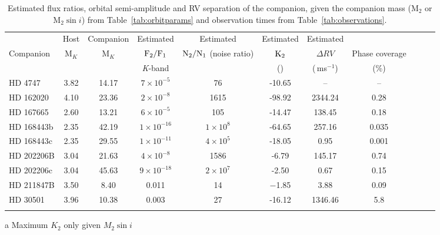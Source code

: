 \begin{table*}
        \small
        \centering
       \begin{threeparttable}[b]
        \caption{Estimated flux ratios, orbital semi-amplitude and RV separation of the companion, given the companion mass (\(\textrm{M}_{2}\) or \(\textrm{M}_{2} \sin{i}\)) from Table~\ref{tab:orbitparams} and observation times from Table~\ref{tab:observations}.} 
        \begin{tabular}{l c c c c c c c c c c}%
            \toprule
            & Host& Companion & Estimated & Estimated & Estimated & Estimated & & \\  %
            Companion & M$_{K}$ & M$_{K}$ & \(\rm F_{2}/F_{1} \) & \(\rm N_{2}/N_{1} \) (noise ratio) & \(\rm K_2\) & \(\Delta RV\) & Phase coverage\\
            & & & \textit{K}-band & & (\kmps{}) & (\,ms\(^{-1}\)) & (\%)\\
            \midrule
            {HD 4747} & 3.82 & 14.17 & \(7\times10^{-5} \) & 76 & -10.65 & -- & --\\  %
            {HD 162020} & 4.10 & 23.36 & \(2\times10^{-8} \) & 1615 & -98.92\tnote{a} & 2344.24 & 0.28\\  %
            {HD 167665} & 2.60 & 13.21 & \(6\times10^{-5} \) & 105 & -14.47\tnote{a} & 138.45 & 0.18\\  %
            {HD 168443b} & 2.35 & 42.19 & \(1\times10^{-16} \) & \(1\times10^{8} \) & -64.65\tnote{a}& 257.16 & 0.035\\ 
            {HD 168443c} & 2.35 & 29.55 & \(1\times10^{-11} \) & \(4\times10^{5} \) & -18.05\tnote{a} & 0.95 & 0.001\\  %
            {HD 202206}B & 3.04& 21.63 & \(4\times10^{-8} \) & 1586 & -6.79 & 145.17 & 0.74\\  %
            {HD 202206}c & 3.04& 45.63 & \(9\times10^{-18}\) & \(2\times10^{7} \) & -2.50 & 0.67 & 0.15\\  %
            {HD 211847}B & 3.50 & 8.40 & 0.011 & 14 & $-$1.85 & 3.88 & 0.09\\  %
            {HD 30501} & 3.96 & 10.38 & 0.003 & 27 & -16.12 & 1346.46 & 5.8\\
            \bottomrule& & 
            \end{tabular}
            \label{tab:estimatedparameters}
    \begin{tablenotes}
        \item[a] {Maximum \(K_2\) only given \(M_2 \sin{i}\)}
      \end{tablenotes}
  \end{threeparttable}

\end{table*}